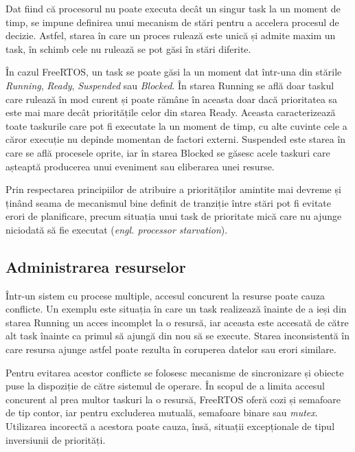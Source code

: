 Dat fiind că procesorul nu poate executa decât un singur task la un moment de timp, se impune definirea unui mecanism de stări pentru a accelera procesul de decizie. Astfel, starea în care un proces rulează este unică și admite maxim un task, în schimb cele nu rulează se pot găsi în stări diferite.


În cazul FreeRTOS, un task se poate găsi la un moment dat într-una din stările \textit{Running}, \textit{Ready}, \textit{Suspended} sau \textit{Blocked}. În starea Running se află doar taskul care rulează în mod curent și poate rămâne în aceasta doar dacă prioritatea sa este mai mare decât prioritățile celor din starea Ready. Aceasta caracterizează toate taskurile care pot fi executate la un moment de timp, cu alte cuvinte cele a căror execuție nu depinde momentan de factori externi. Suspended este starea în care se află procesele oprite, iar în starea Blocked se găsesc acele taskuri care așteaptă producerea unui eveniment sau eliberarea unei resurse. \cite{freertos2} 

Prin respectarea principiilor de atribuire a priorităților amintite mai devreme și ținând seama de mecanismul bine definit de tranziție între stări pot fi evitate erori de planificare, precum situația unui task de prioritate mică care nu ajunge niciodată să fie executat (\textit{engl. processor starvation}).

\subsection{Administrarea resurselor} %

Într-un sistem cu procese multiple, accesul concurent la resurse poate cauza conflicte. Un exemplu este situația în care un task realizează înainte de a ieși din starea Running un acces incomplet la o resursă, iar aceasta este accesată de către alt task înainte ca primul să ajungă din nou să se execute. Starea inconsistentă în care resursa ajunge astfel poate rezulta în coruperea datelor sau erori similare.

Pentru evitarea acestor conflicte se folosesc mecanisme de sincronizare și obiecte puse la dispoziție de către sistemul de operare. În scopul de a limita accesul concurent al prea multor taskuri la o resursă, FreeRTOS oferă cozi și semafoare de tip contor, iar pentru excluderea mutuală, semafoare binare sau \textit{mutex}. Utilizarea incorectă a acestora poate cauza, însă, situații excepționale de tipul inversiunii de priorități. \cite{freertos2}

